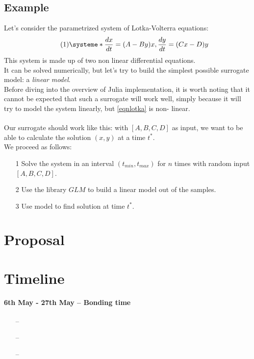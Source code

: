 \documentclass[11pt,a4paper,oneside,titlepage,openright]{book}
\begin{document}
\section*{Example} 
Let's consider the parametrized system of Lotka-Volterra equations: 
\[
\tag{1}
\systeme*{\frac{dx}{dt} =(A-By)x, \frac{dy}{dt} = (Cx-D)y}
\label{eqnlotka}
\]
This system is made up of two non linear differential equations. \\It can be solved numerically, but let's try to build the simplest possible surrogate model: a \textit{linear model}. \\Before diving into the overview of Julia implementation, it is worth noting that it cannot be expected that such a surrogate will work well, simply because it will try to model the system linearly, but \eqref{eqnlotka} is non- linear. \\\\
Our surrogate should work like this: with $[A,B,C,D]$ as input, we want to be able to calculate the solution $(x,y)$ at a time $t^*$.\\
We proceed as follows: 

\begin{itemize}
\item[1] Solve the system in an interval $(t_{min},t_{max})$ for $n$ times with random input $[A,B,C,D]$. 
\item[2] Use the library $GLM$ to build a linear model out of the samples.
\item[3] Use model to find solution at time $t^*$.
\end{itemize}


\chapter*{Proposal}


\chapter*{Timeline}

\subsubsection*{6th May - 27th May -- Bonding time}

\begin{itemize}
\item[--] 
\item[--] 
\item[--] 
\end{itemize}
\end{document}
